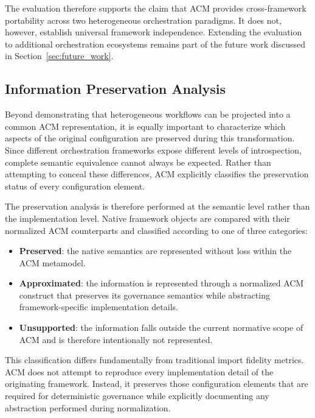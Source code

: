 \documentclass[10pt]{article}
\begin{document}
The evaluation therefore supports the claim that ACM provides cross-framework portability across two heterogeneous orchestration paradigms. It does not, however, establish universal framework independence. Extending the evaluation to additional orchestration ecosystems remains part of the future work discussed in Section~\ref{sec:future_work}.

\subsection{Information Preservation Analysis}
\label{sec:information_preservation}

Beyond demonstrating that heterogeneous workflows can be projected into a common ACM representation, it is equally important to characterize which aspects of the original configuration are preserved during this transformation. Since different orchestration frameworks expose different levels of introspection, complete semantic equivalence cannot always be expected. Rather than attempting to conceal these differences, ACM explicitly classifies the preservation status of every configuration element.

The preservation analysis is therefore performed at the semantic level rather than the implementation level. Native framework objects are compared with their normalized ACM counterparts and classified according to one of three categories:

\begin{itemize}
    \item \textbf{Preserved}: the native semantics are represented without loss within the ACM metamodel.
    \item \textbf{Approximated}: the information is represented through a normalized ACM construct that preserves its governance semantics while abstracting framework-specific implementation details.
    \item \textbf{Unsupported}: the information falls outside the current normative scope of ACM and is therefore intentionally not represented.
\end{itemize}

This classification differs fundamentally from traditional import fidelity metrics. ACM does not attempt to reproduce every implementation detail of the originating framework. Instead, it preserves those configuration elements that are required for deterministic governance while explicitly documenting any abstraction performed during normalization.
\end{document}
